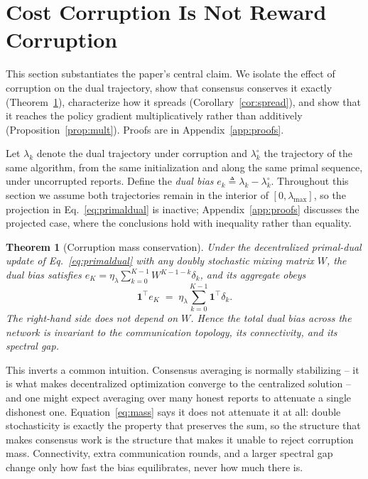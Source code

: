 \documentclass{article}
\newtheorem{theorem}{Theorem}
\begin{document}
\section{Cost Corruption Is Not Reward Corruption}
\label{sec:theory}

This section substantiates the paper's central claim. We isolate the effect of corruption on the dual trajectory, show that consensus conserves it exactly (Theorem~\ref{thm:mass}), characterize how it spreads (Corollary~\ref{cor:spread}), and show that it reaches the policy gradient multiplicatively rather than additively (Proposition~\ref{prop:mult}). Proofs are in Appendix~\ref{app:proofs}.

Let $\lambda_k$ denote the dual trajectory under corruption and $\lambda^\circ_k$ the trajectory of the same algorithm, from the same initialization and along the same primal sequence, under uncorrupted reports. Define the \emph{dual bias} $e_k \triangleq \lambda_k - \lambda^\circ_k$. Throughout this section we assume both trajectories remain in the interior of $[0,\lambda_{\max}]$, so the projection in Eq.~\eqref{eq:primaldual} is inactive; Appendix~\ref{app:proofs} discusses the projected case, where the conclusions hold with inequality rather than equality.

\begin{theorem}[Corruption mass conservation]
\label{thm:mass}
Under the decentralized primal-dual update of Eq.~\eqref{eq:primaldual} with any doubly stochastic mixing matrix $W$, the dual bias satisfies $e_K = \eta_\lambda\sum_{k=0}^{K-1} W^{K-1-k}\delta_k$, and its aggregate obeys
\begin{equation}
\mathbf{1}^\top e_K \;=\; \eta_\lambda \sum_{k=0}^{K-1}\mathbf{1}^\top\delta_k .
\label{eq:mass}
\end{equation}
The right-hand side does not depend on $W$. Hence the total dual bias across the network is invariant to the communication topology, its connectivity, and its spectral gap.
\end{theorem}

This inverts a common intuition. Consensus averaging is normally stabilizing -- it is what makes decentralized optimization converge to the centralized solution -- and one might expect averaging over many honest reports to attenuate a single dishonest one. Equation~\eqref{eq:mass} says it does not attenuate it at all: double stochasticity is exactly the property that preserves the sum, so the structure that makes consensus work is the structure that makes it unable to reject corruption mass. Connectivity, extra communication rounds, and a larger spectral gap change only how fast the bias equilibrates, never how much there is.
\end{document}
